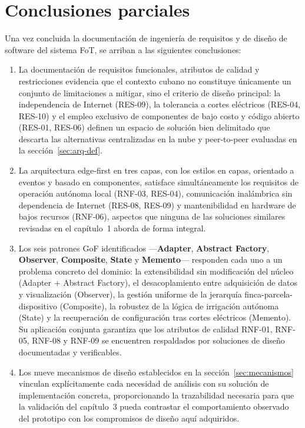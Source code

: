 \section{Conclusiones parciales}
\label{sec:cap2-concl}

Una vez concluida la documentación de ingeniería de requisitos y de diseño
de software del sistema FoT, se arriban a las siguientes conclusiones:

\begin{enumerate}
\setlength\itemsep{0.3em}

\item La documentación de requisitos funcionales, atributos de calidad y
restricciones evidencia que el contexto cubano no constituye únicamente un
conjunto de limitaciones a mitigar, sino el criterio de diseño principal: la
independencia de Internet (RES-09), la tolerancia a cortes eléctricos
(RES-04, RES-10) y el empleo exclusivo de componentes de bajo costo y código
abierto (RES-01, RES-06) definen un espacio de solución bien delimitado que
descarta las alternativas centralizadas en la nube y peer-to-peer evaluadas
en la sección~\ref{sec:arq-def}.

\item La arquitectura edge-first en tres capas, con los estilos en capas,
orientado a eventos y basado en componentes, satisface simultáneamente los
requisitos de operación autónoma local (RNF-03, RES-04), comunicación
inalámbrica sin dependencia de Internet (RES-08, RES-09) y mantenibilidad
en hardware de bajos recursos (RNF-06), aspectos que ninguna de las
soluciones similares revisadas en el capítulo~1 aborda de forma integral.

\item Los seis patrones GoF identificados —\textbf{Adapter}, \textbf{Abstract
Factory}, \textbf{Observer}, \textbf{Composite}, \textbf{State} y
\textbf{Memento}— responden cada uno a un problema concreto del dominio:
la extensibilidad sin modificación del núcleo (Adapter + Abstract Factory),
el desacoplamiento entre adquisición de datos y visualización (Observer), la
gestión uniforme de la jerarquía finca-parcela-dispositivo (Composite), la
robustez de la lógica de irrigación autónoma (State) y la recuperación de
configuración tras cortes eléctricos (Memento). Su aplicación conjunta
garantiza que los atributos de calidad RNF-01, RNF-05, RNF-08 y RNF-09 se
encuentren respaldados por soluciones de diseño documentadas y verificables.

\item Los nueve mecanismos de diseño establecidos en la
sección~\ref{sec:mecanismos} vinculan explícitamente cada necesidad de
análisis con su solución de implementación concreta, proporcionando la
trazabilidad necesaria para que la validación del capítulo~3 pueda
contrastar el comportamiento observado del prototipo con los compromisos de
diseño aquí adquiridos.

\end{enumerate}

\pagebreak